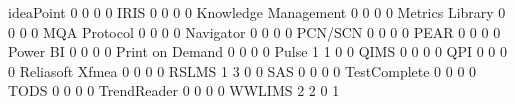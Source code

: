 \documentclass{article}
\begin{document}
\begin{Schunk}
\begin{Soutput}
  ideaPoint                                   0            0            0    0
  IRIS                                        0            0            0    0
  Knowledge Management                        0            0            0    0
  Metrics Library                             0            0            0    0
  MQA Protocol                                0            0            0    0
  Navigator                                   0            0            0    0
  PCN/SCN                                     0            0            0    0
  PEAR                                        0            0            0    0
  Power BI                                    0            0            0    0
  Print on Demand                             0            0            0    0
  Pulse                                       1            1            0    0
  QIMS                                        0            0            0    0
  QPI                                         0            0            0    0
  Reliasoft Xfmea                             0            0            0    0
  RSLMS                                       1            3            0    0
  SAS                                         0            0            0    0
  TestComplete                                0            0            0    0
  TODS                                        0            0            0    0
  TrendReader                                 0            0            0    0
  WWLIMS                                      2            2            0    1
                                          

\end{Soutput}
\end{Schunk}
\end{document}
